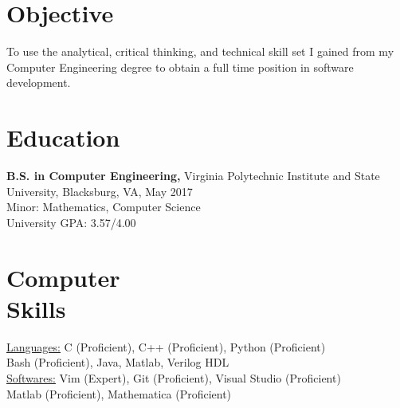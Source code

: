 \documentclass[margin]{res}
\begin{document}
 
 

\address{} %
\address{6200 C Heather Dr \\ Blacksburg, VA 24060 \\
        (540) 835-8657 \\ shengw12@vt.edu } %
 
\begin{resume} %

\section{Objective}
To use the analytical, critical thinking, and technical skill set I gained from my 
Computer Engineering degree to obtain a full time position in software development.

\section{Education} 
{\bf B.S. in Computer Engineering,} Virginia Polytechnic Institute and State University, Blacksburg, VA, May 2017 \\ Minor: Mathematics, Computer Science \\
University GPA: 3.57/4.00

\section{Computer \\ Skills}
\underline{Languages:}  C (Proficient), C++ (Proficient), Python (Proficient) \\ Bash (Proficient), Java, Matlab, Verilog HDL \\ 
\underline{Softwares:}  Vim (Expert), Git (Proficient), Visual Studio (Proficient) \\
     					    Matlab (Proficient), Mathematica (Proficient)
 

\end{resume}
\end{document}
